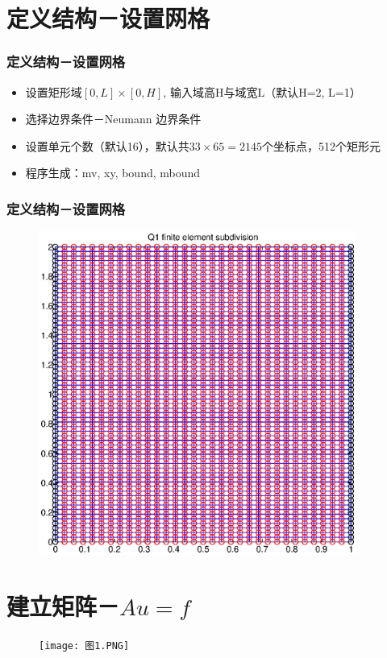 \documentclass[notheorems,mathserif,table,compress]{beamer}  %
\begin{document}
\section{定义结构－设置网格}

%
\begin{frame}
\frametitle{定义结构－设置网格}
\begin{itemize}
\item 设置矩形域$[0,L]\times[0,H]$, 输入域高H与域宽L（默认H=2, L=1）
\item 选择边界条件－Neumann 边界条件
\item 设置单元个数（默认16），默认共$33\times65=2145$个坐标点，512个矩形元
\item 程序生成：mv, xy, bound, mbound
\end{itemize}
\end{frame}

%
\begin{frame}
\frametitle{定义结构－设置网格}
\begin{figure}[!ht]
\centering
\includegraphics[width=4.1in]{untitled.eps}
\end{figure} 
\end{frame}

\section{建立矩阵－$Au=f$}

\begin{frame}
\begin{figure}[!ht]
\centering
\texttt{[image: 图1.PNG]}
\end{figure} 
\end{frame}
\end{document}
